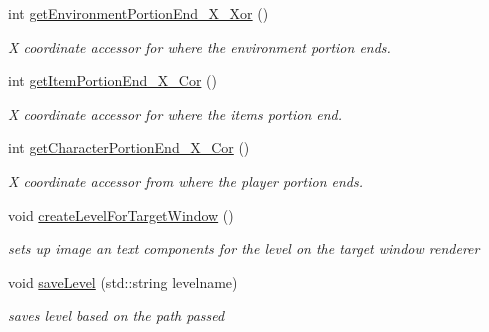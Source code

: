 \begin{DoxyCompactItemize}
int \hyperlink{class_level_editor_a663d0553836d7b0d981b6744b7a603d6}{get\+Environment\+Portion\+End\+\_\+\+X\+\_\+\+Xor} ()
\begin{DoxyCompactList}\small\item\em X coordinate accessor for where the environment portion ends. \end{DoxyCompactList}\item 
\hypertarget{class_level_editor_a00977108fd267ff731aafb515f0585a7}{}\label{class_level_editor_a00977108fd267ff731aafb515f0585a7} 
int \hyperlink{class_level_editor_a00977108fd267ff731aafb515f0585a7}{get\+Item\+Portion\+End\+\_\+\+X\+\_\+\+Cor} ()
\begin{DoxyCompactList}\small\item\em X coordinate accessor for where the items portion end. \end{DoxyCompactList}\item 
\hypertarget{class_level_editor_a021510de8965a1174f073e3509b15b7b}{}\label{class_level_editor_a021510de8965a1174f073e3509b15b7b} 
int \hyperlink{class_level_editor_a021510de8965a1174f073e3509b15b7b}{get\+Character\+Portion\+End\+\_\+\+X\+\_\+\+Cor} ()
\begin{DoxyCompactList}\small\item\em X coordinate accessor from where the player portion ends. \end{DoxyCompactList}\item 
\hypertarget{class_level_editor_a35e76643ca3924aee45b0c1b1551e9cf}{}\label{class_level_editor_a35e76643ca3924aee45b0c1b1551e9cf} 
void \hyperlink{class_level_editor_a35e76643ca3924aee45b0c1b1551e9cf}{create\+Level\+For\+Target\+Window} ()
\begin{DoxyCompactList}\small\item\em sets up image an text components for the level on the target window renderer \end{DoxyCompactList}\item 
\hypertarget{class_level_editor_a4fe7b1a398c68ca3907eaa3f109d36ef}{}\label{class_level_editor_a4fe7b1a398c68ca3907eaa3f109d36ef} 
void \hyperlink{class_level_editor_a4fe7b1a398c68ca3907eaa3f109d36ef}{save\+Level} (std\+::string levelname)
\begin{DoxyCompactList}\small\item\em saves level based on the path passed \end{DoxyCompactList}\item 
\hypertarget{class_level_editor_a90c5ea5d07250f1fdaf5a4fec8c63f95}{}\label{class_level_editor_a90c5ea5d07250f1fdaf5a4fec8c63f95} 

\end{DoxyCompactItemize}
